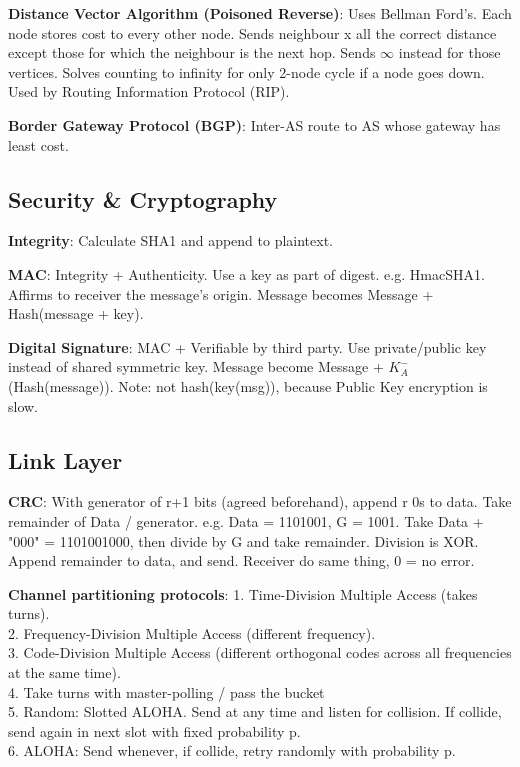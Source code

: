 \documentclass[a4paper,landscape]{article}
\newcommand{\rntopic}[1]{\vspace{-2.0em}\subsection*{#1}\vspace{-1.0em}}
\newcommand{\rnname}[1]{\textbf{#1}}
\begin{document}
\begin{multicols*}{4}
\begin{flatitemize}
\item \rnname{Distance Vector Algorithm (Poisoned Reverse)}: Uses Bellman Ford's. Each node stores cost to every other node. Sends neighbour x all the correct distance except those for which the neighbour is the next hop. Sends $\infty$ instead for those vertices. Solves counting to infinity for only 2-node cycle if a node goes down. Used by Routing Information Protocol (RIP).
\item \rnname{Border Gateway Protocol (BGP)}: Inter-AS route to AS whose gateway has least cost. 
\end{flatitemize}
\rntopic{Security \& Cryptography}
\begin{flatitemize}
\item \rnname{Integrity}: Calculate SHA1 and append to plaintext.
\item \rnname{MAC}: Integrity + Authenticity. Use a key as part of digest. e.g. HmacSHA1. Affirms to receiver the message's origin. Message becomes Message + Hash(message + key).
\item \rnname{Digital Signature}: MAC + Verifiable by third party. Use private/public key instead of shared symmetric key. Message become Message + $K_{A}^{-}$(Hash(message)). Note: not hash(key(msg)), because Public Key encryption is slow.
\end{flatitemize}
\rntopic{Link Layer}
\begin{flatitemize}
\item \rnname{CRC}: With generator of r+1 bits (agreed beforehand), append r 0s to data. Take remainder of Data / generator. e.g. Data = 1101001, G = 1001. Take Data + "000" = 1101001000, then divide by G and take remainder. Division is XOR. Append remainder to data, and send. Receiver do same thing, 0 = no error.
\item \rnname{Channel partitioning protocols}: 
1. Time-Division Multiple Access (takes turns). \\
2. Frequency-Division Multiple Access (different frequency). \\
3. Code-Division Multiple Access (different orthogonal codes across all frequencies at the same time).\\
4. Take turns with master-polling / pass the bucket\\
5. Random: Slotted ALOHA. Send at any time and listen for collision. If collide, send again in next slot with fixed probability p.\\
6. ALOHA: Send whenever, if collide, retry randomly with probability p.\\

\end{flatitemize}
\end{multicols*}
\end{document}

